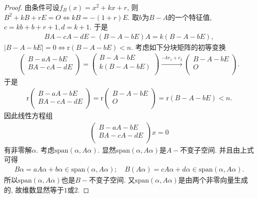 \documentclass[../../main.tex]{subfiles}%
\begin{document}
\begin{proof}

由条件可设$f_B\left( x \right) =x^2+kx+r$, 则
$B^2+kB+rE=O\Longleftrightarrow kB=-\left( 1+r \right) E.$
取$b$为$B-A$的一个特征值, $c=kb+b+r+1,d=k+1$. 于是
\begin{align*}
BA-cA-dE-\left( B-A-bE \right) A=k\left( B-A-bE \right) ,
\end{align*}
$| B-A-bE |=0\Longleftrightarrow \mathrm{r}\left( B-A-bE \right) <n.$
考虑如下分块矩阵的初等变换
\begin{align*}
\left( \begin{array}{c}
B-aA-bE\\
BA-cA-dE\\
\end{array} \right) =\left( \begin{array}{c}
B-A-bE\\
k\left( B-A-bE \right)\\
\end{array} \right) \xrightarrow{-kr_1+r_2}\left( \begin{array}{c}
B-A-bE\\
O\\
\end{array} \right) .
\end{align*}
于是
\begin{align*}
\mathrm{r}\left( \begin{array}{c}
B-aA-bE\\
BA-cA-dE\\
\end{array} \right) =\mathrm{r}\left( \begin{array}{c}
B-A-bE\\
O\\
\end{array} \right) =\mathrm{r}\left( B-A-bE \right) <n.
\end{align*}
因此线性方程组
\begin{align*}
\left( \begin{array}{c}
B-aA-bE\\
BA-cA-dE\\
\end{array} \right) x=0
\end{align*}
有非零解$\alpha$. 考虑$\mathrm{span}\left( \alpha ,A\alpha \right)$. 显然$\mathrm{span}\left( \alpha ,A\alpha \right)$是$A-$不变子空间. 并且由上式可得
\begin{align*}
B\alpha =aA\alpha +b\alpha \in \mathrm{span}\left( \alpha ,A\alpha \right) ;\quad B\left( A\alpha \right) =cA\alpha +d\alpha \in \mathrm{span}\left( \alpha ,A\alpha \right) .
\end{align*}
所以$\mathrm{span}\left( \alpha ,A\alpha \right)$也是$B-$不变子空间. 又$\mathrm{span}\left( \alpha ,A\alpha \right)$是由两个非零向量生成的, 故维数显然等于$1$或$2$.

\end{proof}
\end{document}
